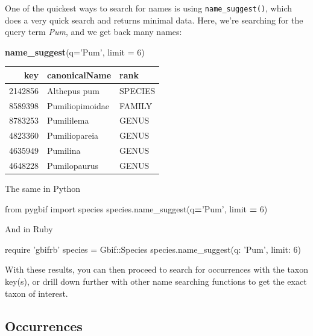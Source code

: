 \documentclass[author-year, review, 11pt]{components/elsarticle} %
\newenvironment{Shaded}{\begin{snugshade}}{\end{snugshade}}
\newcommand{\KeywordTok}[1]{\textcolor[rgb]{0.13,0.29,0.53}{\textbf{#1}}}
\newcommand{\DataTypeTok}[1]{\textcolor[rgb]{0.13,0.29,0.53}{#1}}
\newcommand{\DecValTok}[1]{\textcolor[rgb]{0.00,0.00,0.81}{#1}}
\newcommand{\StringTok}[1]{\textcolor[rgb]{0.31,0.60,0.02}{#1}}
\newcommand{\ImportTok}[1]{#1}
\newcommand{\OperatorTok}[1]{\textcolor[rgb]{0.81,0.36,0.00}{\textbf{#1}}}
\newcommand{\NormalTok}[1]{#1}
\begin{document}
One of the quickest ways to search for names is using
\texttt{name\_suggest()}, which does a very quick search and returns
minimal data. Here, we're searching for the query term \emph{Pum}, and
we get back many names:

\begin{Shaded}
\begin{Highlighting}[]
\KeywordTok{name_suggest}\NormalTok{(}\DataTypeTok{q=}\StringTok{'Pum'}\NormalTok{, }\DataTypeTok{limit =} \DecValTok{6}\NormalTok{)}
\end{Highlighting}
\end{Shaded}

\begin{longtable}[]{@{}rll@{}}
\toprule
key & canonicalName & rank\tabularnewline
\midrule
\endhead
2142856 & Althepus pum & SPECIES\tabularnewline
8589398 & Pumiliopimoidae & FAMILY\tabularnewline
8783253 & Pumililema & GENUS\tabularnewline
4823360 & Pumiliopareia & GENUS\tabularnewline
4635949 & Pumilina & GENUS\tabularnewline
4648228 & Pumilopaurus & GENUS\tabularnewline
\bottomrule
\end{longtable}

The same in Python

\begin{Shaded}
\begin{Highlighting}[]
\ImportTok{from}\NormalTok{ pygbif }\ImportTok{import}\NormalTok{ species}
\NormalTok{species.name_suggest(q}\OperatorTok{=}\StringTok{'Pum'}\NormalTok{, limit }\OperatorTok{=} \DecValTok{6}\NormalTok{)}
\end{Highlighting}
\end{Shaded}

And in Ruby

\begin{Shaded}
\begin{Highlighting}[]
\NormalTok{require }\StringTok{'gbifrb'}
\NormalTok{species = }\DataTypeTok{Gbif}\NormalTok{::}\DataTypeTok{Species}
\NormalTok{species.name_suggest(}\StringTok{q: 'Pum'}\NormalTok{, }\StringTok{limit: }\DecValTok{6}\NormalTok{)}
\end{Highlighting}
\end{Shaded}

With these results, you can then proceed to search for occurrences with
the taxon key(s), or drill down further with other name searching
functions to get the exact taxon of interest.

\subsection{Occurrences}\label{occurrences}
\end{document}
